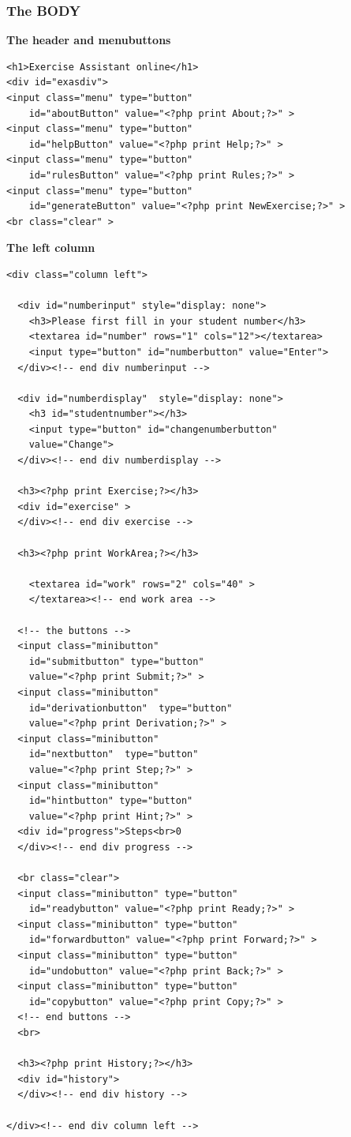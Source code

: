 \documentclass{article}
\begin{document}
\subsubsection{The BODY}
\textbf{The header and menubuttons}
\begin{verbatim}
<h1>Exercise Assistant online</h1>
<div id="exasdiv">
<input class="menu" type="button" 
    id="aboutButton" value="<?php print About;?>" >
<input class="menu" type="button" 
    id="helpButton" value="<?php print Help;?>" >
<input class="menu" type="button" 
    id="rulesButton" value="<?php print Rules;?>" >
<input class="menu" type="button" 
    id="generateButton" value="<?php print NewExercise;?>" >
<br class="clear" >
\end{verbatim}
\textbf{The left column}
\begin{verbatim}
<div class="column left">

  <div id="numberinput" style="display: none">
    <h3>Please first fill in your student number</h3>
    <textarea id="number" rows="1" cols="12"></textarea>
    <input type="button" id="numberbutton" value="Enter">
  </div><!-- end div numberinput -->
	
  <div id="numberdisplay"  style="display: none">
    <h3 id="studentnumber"></h3>
    <input type="button" id="changenumberbutton" 
    value="Change">
  </div><!-- end div numberdisplay -->
	
  <h3><?php print Exercise;?></h3>
  <div id="exercise" >
  </div><!-- end div exercise -->

  <h3><?php print WorkArea;?></h3>

	<textarea id="work" rows="2" cols="40" >	
	</textarea><!-- end work area -->
	
  <!-- the buttons -->
  <input class="minibutton" 
    id="submitbutton" type="button" 
    value="<?php print Submit;?>" >	
  <input class="minibutton" 
    id="derivationbutton"  type="button" 
    value="<?php print Derivation;?>" >
  <input class="minibutton" 
    id="nextbutton"  type="button" 
    value="<?php print Step;?>" >
  <input class="minibutton" 
    id="hintbutton" type="button" 
    value="<?php print Hint;?>" >
  <div id="progress">Steps<br>0
  </div><!-- end div progress -->
	
  <br class="clear">
  <input class="minibutton" type="button" 
    id="readybutton" value="<?php print Ready;?>" >
  <input class="minibutton" type="button" 
    id="forwardbutton" value="<?php print Forward;?>" >
  <input class="minibutton" type="button" 
    id="undobutton" value="<?php print Back;?>" >
  <input class="minibutton" type="button" 
    id="copybutton" value="<?php print Copy;?>" >
  <!-- end buttons -->
  <br>
	
  <h3><?php print History;?></h3>
  <div id="history">
  </div><!-- end div history -->

</div><!-- end div column left -->
\end{verbatim}
\end{document}
